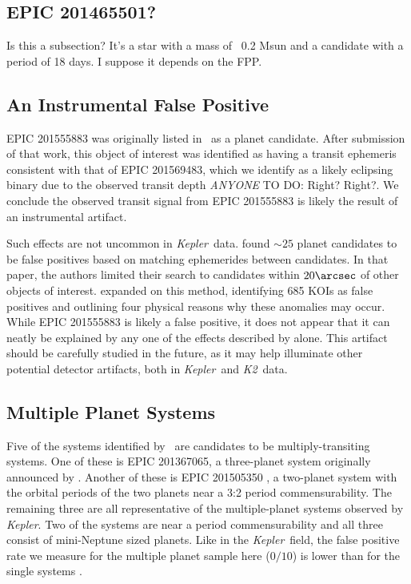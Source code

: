 \documentclass{emulateapj}
\newcommand{\project}[1]{\textsl{#1}}
\newcommand{\kep}{\project{Kepler}}
\newcommand{\KT}{\project{K2}}
\newcommand{\paperit}{\citet{Foreman-Mackey15}}
\newcommand{\todo}[3]{{\color{#2} \emph{#1} TO DO: #3}}
\newcommand{\anytodo}[1]{\todo{ANYONE}{NavyBlue}{#1}}
\begin{document}
\subsection{EPIC 201465501?}
Is this a subsection? It's a star with a mass of ~0.2 Msun and a candidate with
a period of 18 days. I suppose it depends on the FPP.

\subsection{An Instrumental False Positive}

EPIC 201555883 was originally listed in \paperit\ as a planet candidate.
After submission of that work, this object of interest was identified as
having a transit ephemeris consistent with that of EPIC 201569483,
which we identify as a likely eclipsing binary due to the observed transit
depth \anytodo{Right? Right?}.
We conclude the observed transit signal from EPIC 201555883 is likely the result
of an instrumental artifact.

Such effects are not uncommon in \kep\ data.
\citet{Batalha13} found $\sim 25$ planet candidates to be false positives based on matching
ephemerides between candidates.
In that paper, the authors limited their search to candidates within $20\arcsec$ of other
objects of interest.
\citet{Coughlin14} expanded on this method, identifying 685 KOIs as false positives and
outlining four physical reasons why these anomalies may occur.
While EPIC 201555883 is likely a false positive, it does not appear that it can neatly be
explained by any one of the effects described by \citet{Coughlin14} alone.
This artifact should be carefully studied in the future, as it may help illuminate other
potential detector artifacts, both in \kep\ and \KT\ data.


\subsection{Multiple Planet Systems}
Five of the systems identified by \paperit\ are candidates to be multiply-transiting
systems.
One of these is EPIC 201367065, a three-planet system originally announced by
\citet{Crossfield15}.
Another of these is EPIC 201505350 \citep{Armstrong15b}, a two-planet system with the
orbital periods of the two planets near a 3:2 period commensurability.
The remaining three are all representative of the multiple-planet systems observed by
\kep \citep{Lissauer11b, Fabrycky14}.
Two of the systems are near a period commensurability and all three consist of
mini-Neptune sized planets.
Like in the \kep\ field, the false positive rate we measure for the multiple planet sample
here ($0/10$) is lower than for the single systems \citep{Lissauer12, Rowe14}.
\end{document}
